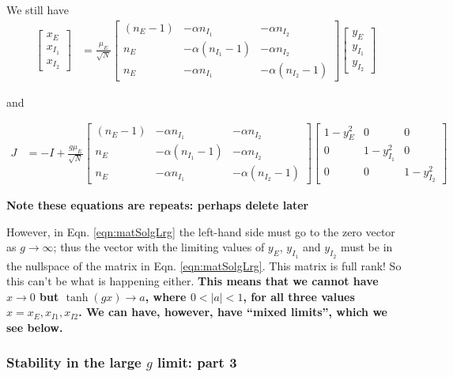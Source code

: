 \documentclass[11pt,reqno]{amsart}
\begin{document}
We still have
 \begin{align}
 \begin{bmatrix} x_E\\x_{I_1}\\x_{I_2}\end{bmatrix} 
 &= \frac{\mu_E}{\sqrt{N}} 
 \begin{bmatrix} (n_E - 1) & -\alpha n_{I_1} & - \alpha n_{I_2}  \\
 n_E  & -\alpha (n_{I_1}-1) & - \alpha n_{I_2}  \\
 n_E  & -\alpha n_{I_1} & - \alpha (n_{I_2}-1)  
 \end{bmatrix}
 \begin{bmatrix} y_E\\y_{I_1}\\y_{I_2}\end{bmatrix}   \label{eqn:matSolgLrg}
 \end{align}
 
 and
 
 \begin{align}
 J &= -I + 
 \frac{g\mu_E}{\sqrt{N}} 
 \begin{bmatrix} (n_E - 1) & -\alpha n_{I_1} & - \alpha n_{I_2}  \\
 n_E  & -\alpha (n_{I_1}-1) & - \alpha n_{I_2}  \\
 n_E  & -\alpha n_{I_1} & - \alpha (n_{I_2}-1)  
 \end{bmatrix}
 \begin{bmatrix} 1-y_E^2 & 0 & 0 \\0 &  1-y_{I_1}^2 & 0\\0 & 0 &1-y_{I_2}^2\end{bmatrix} \label{eqn:Jmat_3pop}
 \end{align}
 
 \textbf{Note these equations are repeats: perhaps delete later}
 
However, in Eqn. \eqref{eqn:matSolgLrg} the left-hand side must go to the zero vector as $g \rightarrow \infty$; thus the vector with the limiting values of $y_E$, $y_{I_1}$ and $y_{I_2}$ must be in the nullspace of the matrix in Eqn. \eqref{eqn:matSolgLrg}. This matrix is full rank! So this can't be what is happening either. \textbf{This means that we cannot have $x \rightarrow 0$ but $\tanh(gx) \rightarrow a$, where $0 < |a| < 1$, for all three values $x = x_E, x_{I1}, x_{I2}$. We can have, however, have ``mixed limits'', which we see below.}


\subsubsection{Stability in the large $g$ limit: part 3}
\end{document}
